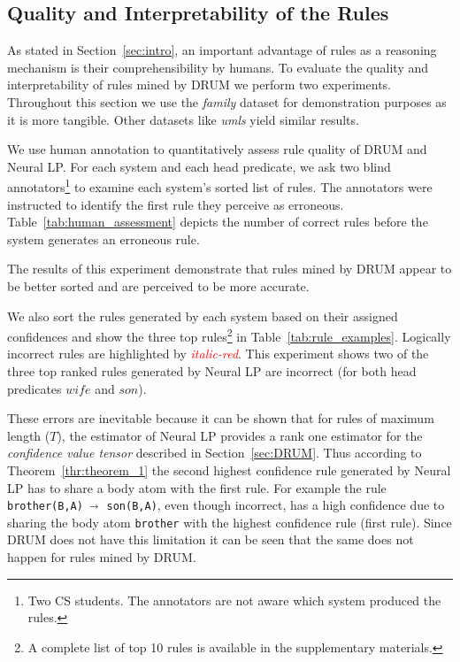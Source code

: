 \documentclass{article}
\begin{document}
\subsection{Quality and Interpretability of the Rules}
\label{sec:rule_interpretability}

As stated in Section~\ref{sec:intro}, an important advantage of rules as a reasoning mechanism is their comprehensibility by humans. To evaluate the quality and interpretability of rules mined by DRUM we perform two experiments. Throughout this section we use the \textit{family} dataset for demonstration purposes as it is more tangible. Other datasets like \textit{umls} yield similar results.

\newlength{\oldintextsep}
\setlength{\oldintextsep}{\intextsep}
\setlength{\intextsep}{-11pt}\setlength{\columnsep}{10pt}We use human annotation to quantitatively assess rule quality of DRUM and Neural LP. For each system and each head predicate, we ask two blind annotators\footnote{Two CS students. The annotators are not aware which system produced the rules.} to examine each system's sorted list of rules. The annotators were instructed to identify the first rule they perceive as erroneous. Table~\ref{tab:human_assessment} depicts the number of correct rules before the system generates an erroneous rule.


\setlength{\intextsep}{\oldintextsep} The results of this experiment demonstrate that rules mined by DRUM appear to be better sorted and are perceived to be more accurate.

We also sort the rules generated by each system based on their assigned confidences and show the three top rules\footnote{A complete list of top 10 rules is available in the supplementary materials.} in Table~\ref{tab:rule_examples}. Logically incorrect rules are highlighted by \textit{\textcolor{red}{italic-red}}. This experiment shows two of the three top ranked rules generated by Neural LP are incorrect (for both head predicates $wife$ and $son$). 

These errors are inevitable because it can be shown that for rules of maximum length ($T$), the estimator of Neural LP provides a rank one estimator for the \textit{confidence value tensor} described in Section~\ref{sec:DRUM}. Thus according to Theorem~\ref{thr:theorem_1} the second highest confidence rule generated by Neural LP has to share a body atom with the first rule. For example the rule \texttt{brother(B,A) $\shortrightarrow$ son(B,A)}, even though incorrect, has a high confidence due to sharing the body atom \texttt{brother} with the highest confidence rule (first rule). Since DRUM does not have this limitation it can be seen that the same does not happen for rules mined by DRUM.  
\end{document}
